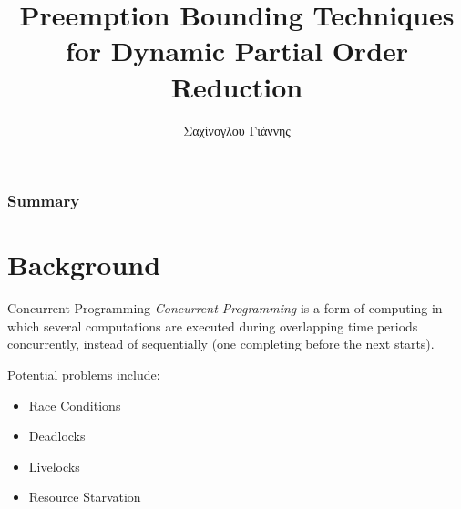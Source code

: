 \documentclass[9pt]{beamer}
\title[Short title]{Preemption Bounding Techniques for Dynamic Partial Order Reduction} %
\author{Σαχίνογλου Γιάννης} %
\institute[NTUA] %
{
ΣΗΜΜΥ - ΕΜΠ \\ %
\medskip
\textit{03112089} %
}
\date{} %
\begin{document}
\begin{frame}
\titlepage %
\end{frame}

\begin{frame}
\frametitle{Summary} %
\tableofcontents %
\end{frame}





\section{Background}

\begin{frame}{Concurrent Programming}
\emph{Concurrent Programming} is a form of computing in which several computations are executed during
overlapping time periods concurrently, instead of sequentially (one completing before the next starts).

Potential problems include:
\pause
\begin{itemize}[<+->]
\item Race Conditions
\item Deadlocks
\item Livelocks
\item Resource Starvation
\end{itemize}

\end{frame}
\end{document}
